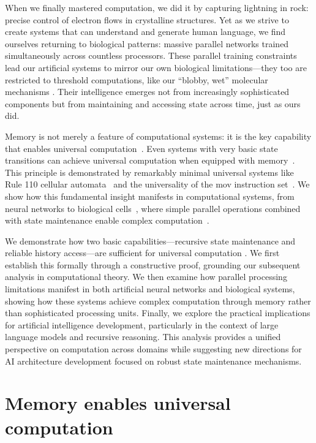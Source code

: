 \documentclass[12pt]{article}
\begin{document}
When we finally mastered computation, we did it by capturing lightning in rock: precise control of electron flows in crystalline structures.
Yet as we strive to create systems that can understand and generate human language, we find ourselves returning to biological patterns: massive parallel networks trained simultaneously across countless processors.
These parallel training constraints lead our artificial systems to mirror our own biological limitations---they too are restricted to threshold computations, like our ``blobby, wet'' molecular mechanisms \cite{alberts2022molecular}.
Their intelligence emerges not from increasingly sophisticated components but from maintaining and accessing state across time, just as ours did.

Memory is not merely a feature of computational systems: it is the key capability that enables universal computation~\cite{turing1936computable}.
Even systems with very basic state transitions can achieve universal computation when equipped with memory~\cite{merrill2023parallelism,peng2024limitations}.
This principle is demonstrated by remarkably minimal universal systems like Rule 110 cellular automata~\cite{cook2004universality} and the universality of the mov instruction set~\cite{dolan2013mov}.
We show how this fundamental insight manifests in computational systems, from neural networks to biological cells~\cite{wang2023parallel}, where simple parallel operations combined with state maintenance enable complex computation~\cite{swamy1983space,boyle2024memory}.

We demonstrate how two basic capabilities---recursive state maintenance and reliable history access---are sufficient for universal computation \cite{turing1936computable,sipser1996introduction,savage1994space,bennett1989time}.
We first establish this formally through a constructive proof, grounding our subsequent analysis in computational theory.
We then examine how parallel processing limitations manifest in both artificial neural networks and biological systems, showing how these systems achieve complex computation through memory rather than sophisticated processing units.
Finally, we explore the practical implications for artificial intelligence development, particularly in the context of large language models and recursive reasoning.
This analysis provides a unified perspective on computation across domains while suggesting new directions for AI architecture development focused on robust state maintenance mechanisms.

\section{Memory enables universal computation}
\end{document}
